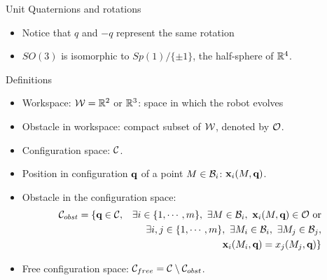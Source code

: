 %
%
\begin {frame} {Unit Quaternions and rotations}
  \begin{itemize}
    \item Notice that $q$ and $-q$ represent the same rotation
    \item $SO(3)$ is isomorphic to $Sp(1)/\{\pm 1\}$, the half-sphere of
      $\mathbb{R}^4$.
  \end{itemize}
\end{frame}

%
%

%
%

%
%

\begin{frame} {Definitions}

\begin{itemize}
\item Workspace: ${\cal W}=\mathbb{R}^2$ or $\mathbb{R}^3$: space in which the robot evolves
\pause
\item Obstacle in workspace: compact subset of ${\cal W}$, denoted by ${\cal O}$.
\pause
\item Configuration space: ${\cal C}$.
\pause
\item Position in configuration $\textbf{q}$ of a point $M\in{\cal B}_i$:
  $\textbf{x}_i(M,\textbf{q})$.
\pause
\item Obstacle in the configuration space:
\begin{eqnarray*}
{\cal C}_{obst}&=\{\textbf{q}\in{\cal C},&\exists i\in\{1,\cdots,m\},\ \exists M\in{\cal B}_i,\ \textbf{x}_i(M,\textbf{q})\in{\cal O}\ \mbox{or}\\
&&\exists i,j\in\{1,\cdots,m\},\ \exists M_i\in{\cal B}_i,\ \exists M_j\in{\cal B}_j,\\
&&\textbf{x}_i(M_i,\textbf{q})=x_j(M_j,\textbf{q})\}
\end{eqnarray*}
\pause
\item Free configuration space: ${\cal C}_{free} = {\cal C}\setminus{\cal C}_{obst}$.
\end{itemize}
\end{frame}

